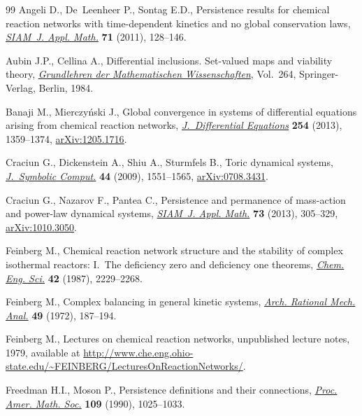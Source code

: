 \documentclass[pdftex]{sigma}
\begin{document}
\begin{thebibliography}{99}
Angeli D., De~Leenheer P., Sontag E.D., Persistence results for chemical
  reaction networks with time-dependent kinetics and no global conservation
  laws, \href{http://dx.doi.org/10.1137/090779401}{\textit{SIAM~J. Appl. Math.}} \textbf{71} (2011), 128--146.

Aubin J.P., Cellina A., Dif\/ferential inclusions. Set-valued maps and viability
  theory, \href{http://dx.doi.org/10.1007/978-3-642-69512-4}{\textit{Grundlehren der Ma\-the\-matischen Wissenschaften}}, Vol.~264,
  Springer-Verlag, Berlin, 1984.

Banaji M., Mierczy{\'n}ski J., Global convergence in systems of dif\/ferential
  equations arising from chemical reaction networks, \href{http://dx.doi.org/10.1016/j.jde.2012.10.018}{\textit{J.~Differential
  Equations}} \textbf{254} (2013), 1359--1374, \href{http://arxiv.org/abs/1205.1716}{arXiv:1205.1716}.

Craciun G., Dickenstein A., Shiu A., Sturmfels B., Toric dynamical systems,
  \href{http://dx.doi.org/10.1016/j.jsc.2008.08.006}{\textit{J.~Symbolic Comput.}} \textbf{44} (2009), 1551--1565,
  \href{http://arxiv.org/abs/0708.3431}{arXiv:0708.3431}.

Craciun G., Nazarov F., Pantea C., Persistence and permanence of mass-action
  and power-law dynamical systems, \href{http://dx.doi.org/10.1137/100812355}{\textit{SIAM~J. Appl. Math.}} \textbf{73}
  (2013), 305--329, \href{http://arxiv.org/abs/1010.3050}{arXiv:1010.3050}.

Feinberg M., Chemical reaction network structure and the stability of complex
  isothermal reactors: I.~The def\/iciency zero and def\/iciency one theorems,
  \href{http://dx.doi.org/10.1016/0009-2509(87)80099-4}{\textit{Chem. Eng. Sci.}} \textbf{42} (1987), 2229--2268.

Feinberg M., Complex balancing in general kinetic systems, \href{http://dx.doi.org/10.1007/BF00255665}{\textit{Arch.
  Rational Mech. Anal.}} \textbf{49} (1972), 187--194.

Feinberg M., Lectures on chemical reaction networks, unpublished lecture notes,
  1979, available at
 \mbox{\url{http://www.che.eng.ohio-state.edu/~FEINBERG/LecturesOnReactionNetworks/}}.

Freedman H.I., Moson P., Persistence def\/initions and their connections,
  \href{http://dx.doi.org/10.2307/2048133}{\textit{Proc. Amer. Math. Soc.}} \textbf{109} (1990), 1025--1033.


\end{thebibliography}
\end{document}
